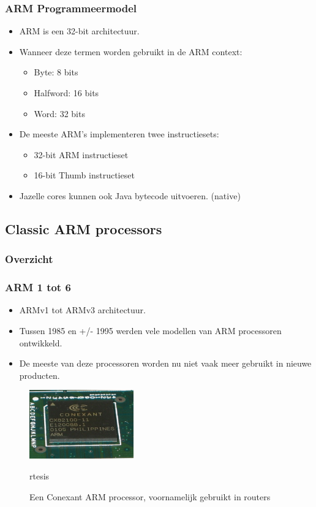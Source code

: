 \documentclass{beamer}
\begin{document}
\begin{frame} 
\frametitle{ARM Programmeermodel}
\begin{itemize}
 \item <1-> ARM is een 32-bit architectuur.
 \item <2-> Wanneer deze termen worden gebruikt in de ARM context:
    \begin{itemize}
    \item Byte: 8 bits
    \item Halfword: 16 bits
    \item Word: 32 bits
    \end{itemize}
 \item <3-> De meeste ARM's implementeren twee instructiesets:
    \begin{itemize}
    \item 32-bit ARM instructieset
    \item 16-bit Thumb instructieset
    \end{itemize}
 \item <4-> Jazelle cores kunnen ook Java bytecode uitvoeren. (native)
\end{itemize}
\end{frame}

\subsection{Classic ARM processors}
\begin{frame}
\frametitle{Overzicht}
\tableofcontents[sectionstyle=show/shaded,subsectionstyle=show/shaded] 
\end{frame}

\begin{frame} 
\frametitle{ARM 1 tot 6}
\begin{itemize}
 \item <1-> ARMv1 tot ARMv3 architectuur.
 \item <2-> Tussen 1985 en +/- 1995 werden vele modellen van ARM processoren ontwikkeld.
 \item <3-> De meeste van deze processoren worden nu niet vaak meer gebruikt in nieuwe producten.
\end{itemize}
\begin{figure}[h] \begin{center}
\includegraphics[width=0.4\textwidth]{figures/conexant-arm.jpg}
\caption{Een Conexant ARM processor, voornamelijk gebruikt in routers}rtesis
\end{center} \end{figure}
\end{frame}
\end{document}
